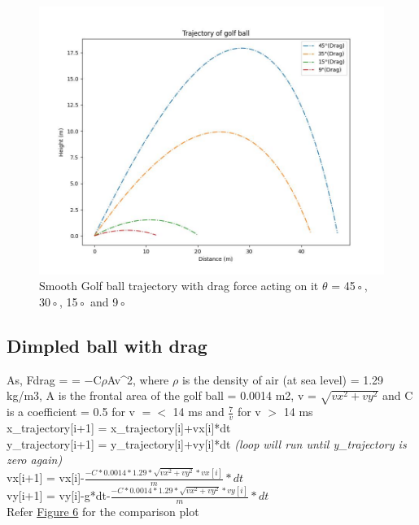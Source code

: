 \documentclass[11pt]{article}
\begin{document}
\begin{figure}[b]
    \centering
    \includegraphics[width=\textwidth, height=\textheight, keepaspectratio]{Golf_Trajectory_Smooth_Drag.jpeg}
    \caption{Smooth Golf ball trajectory with drag force acting on it $\theta$ = 45◦, 30◦, 15◦ and 9◦}
    \label{fig:Smooth_Fdrag_trajectory}
\end{figure}

\subsection{Dimpled ball with drag}
As, Fdrag = = −C$\rho$Av^2, where $\rho$ is the density of air (at sea level) = 1.29 kg/m3, A is the frontal area of the golf ball = 0.0014 m2, v = $\sqrt{vx^2+vy^2}$ and C is a coefficient = 0.5 for v $=<$ 14 m\/s and $\frac{7}{v}$ for v $>$ 14 m\/s\\
x\_trajectory[i+1] = x\_trajectory[i]+vx[i]*dt\\
y\_trajectory[i+1] = y\_trajectory[i]+vy[i]*dt \textit{(loop will run until y\_trajectory is zero again)}\\
vx[i+1] = vx[i]-$\frac{-C*0.0014*1.29*\sqrt{vx^2+vy^2}*vx[i]}{m}*dt$\\
vy[i+1] = vy[i]-g*dt-$\frac{-C*0.0014*1.29*\sqrt{vx^2+vy^2}*vy[i]}{m}*dt$\\
Refer \hyperref[fig:Dimpled_Fdrag_trajectory]{Figure 6} for the comparison plot
\end{document}
